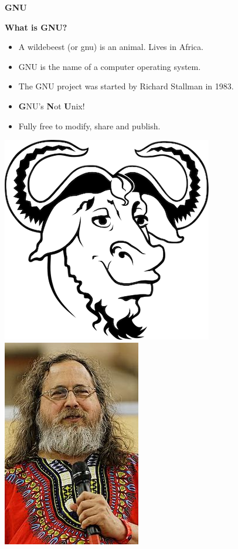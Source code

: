 \documentclass[ignorenonframetext,]{beamer}
\providecommand{\tightlist}{%
  \setlength{\itemsep}{0pt}\setlength{\parskip}{0pt}}
\begin{document}
\begin{frame}{\textbf{GNU}}

\begin{block}{\textbf{What is GNU?}}

\begin{itemize}
\tightlist
\item
  A wildebeest (or gnu) is an animal. Lives in Africa.
\item
  GNU is the name of a computer operating system.
\item
  The GNU project was started by Richard Stallman in 1983.
\item
  {\textbf{G}}NU's {\textbf{N}}ot {\textbf{U}}nix!
\item
  Fully free to modify, share and publish.
\end{itemize}

\includegraphics{gnu_logo.png} \includegraphics{Richard.jpg}

\end{block}

\end{frame}
\end{document}
